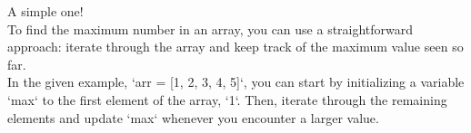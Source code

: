 \documentclass[preview]{standalone}
\begin{document}
A simple one!\\To find the maximum number in an array, you can use a straightforward approach: iterate through the array and keep track of the maximum value seen so far.\\In the given example, `arr = [1, 2, 3, 4, 5]`, you can start by initializing a variable `max` to the first element of the array, `1`. Then, iterate through the remaining elements and update `max` whenever you encounter a larger value.\\
\end{document}
